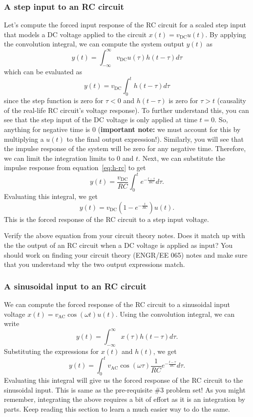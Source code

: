 \documentclass{ee102_notes}
\begin{document}
\subsubsection{A step input to an RC circuit}
Let's compute the forced input response of the RC circuit for a scaled step input that models a DC voltage applied to the circuit $x(t) = v_{\text{DC}} u(t)$. By applying the convolution integral, we can compute the system output $y(t)$ as 
\[
y(t) = \int_{-\infty}^{\infty} v_{\text{DC}} u(\tau) h(t - \tau) d\tau
\]
which can be evaluated as
\[
y(t) = v_{\text{DC}} \int_{0}^{t} h(t - \tau) d\tau
\]
since the step function is zero for $\tau < 0$ and $h(t - \tau)$ is zero for $\tau > t$ (causality of the real-life RC circuit's voltage response). To further understand this, you can see that the step input of the DC voltage is only applied at time $t = 0$. So, anything for negative time is 0 (\textbf{\color{blue}important note:} we must account for this by multiplying a $u(t)$ to the final output expression!). Similarly, you will see that the impulse response of the system will be zero for any negative time. Therefore, we can limit the integration limits to $0$ and $t$. Next, we can substitute the impulse response from equation~\eqref{eq:h-rc} to get
\[
y(t) = \frac{v_{\text{DC}}}{RC} \int_{0}^{t} e^{-\frac{t - \tau}{RC}} d\tau.
\]
Evaluating this integral, we get
\begin{equation}
    \label{eq:step-RC}
y(t) = v_{\text{DC}} \left(1 - e^{-\frac{t}{RC}}\right)u(t).
\end{equation}
This is the forced response of the RC circuit to a step input voltage. 
\begin{popquiz}
    Verify the above equation from your circuit theory notes. Does it match up with the the output of an RC circuit when a DC voltage is applied as input?
    \popqsplit
    You should work on finding your circuit theory (ENGR/EE 065) notes and make sure that you understand why the two output expressions match. 
\end{popquiz}

\subsubsection{A sinusoidal input to an RC circuit}
We can compute the forced response of the RC circuit to a sinusoidal input voltage $x(t) = v_{\text{AC}} \cos(\omega t) u(t)$. Using the convolution integral, we can write
\[
y(t) = \int_{-\infty}^{\infty} x(\tau) h(t - \tau) d\tau.
\]
Substituting the expressions for $x(t)$ and $h(t)$, we get
\begin{equation}
    \label{eq:sine-RC}
y(t) = \int_{0}^{t} v_{\text{AC}} \cos(\omega \tau)\frac{1}{RC} e^{-\frac{t - \tau}{RC}} d\tau.
\end{equation}
Evaluating this integral will give us the forced response of the RC circuit to the sinusoidal input. This is same as the pre-requisite \#3 problem set! As you might remember, integrating the above requires a bit of effort as it is an integration by parts. Keep reading this section to learn a much easier way to do the same. 
\end{document}
